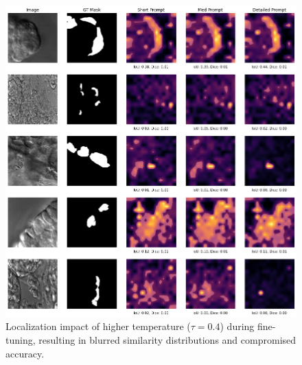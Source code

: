 \documentclass[./dissertation.tex]{subfiles}
\begin{document}
\begin{figure}
  \centering
  \includegraphics[width=\textwidth]{figures/sam/fine-tuned with mask th 0.4.png}
  \caption{Localization impact of higher temperature (\(\tau = 0.4\)) during fine-tuning, resulting in blurred similarity distributions and compromised accuracy.}
  \label{fig:fine_tuned_with_mask_th_0_4}
\end{figure}
\end{document}
